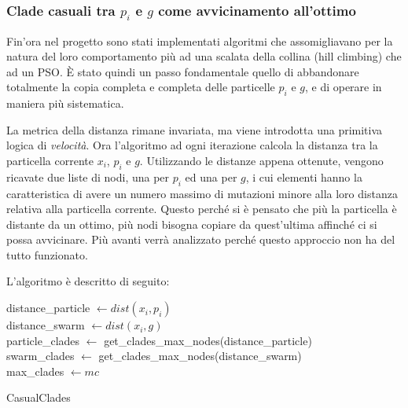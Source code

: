 \subsubsection{Clade casuali tra $p_i$ e $g$ come avvicinamento all'ottimo}
\label{chap:pso-adapt-calculate-5}
Fin'ora nel progetto sono stati implementati algoritmi che assomigliavano per la natura del loro comportamento più ad una scalata della collina (hill climbing) che ad un PSO. È stato quindi un passo fondamentale quello di abbandonare totalmente la copia completa e completa delle particelle $p_i$ e $g$, e di operare in maniera più sistematica.

La metrica della distanza rimane invariata, ma viene introdotta una primitiva logica di \textit{velocità}. Ora l'algoritmo ad ogni iterazione calcola la distanza tra la particella corrente $x_i$, $p_i$ e $g$. Utilizzando le distanze appena ottenute, vengono ricavate due liste di nodi, una per $p_i$ ed una per $g$, i cui elementi hanno la caratteristica di avere un numero massimo di mutazioni minore alla loro distanza relativa alla particella corrente. Questo perché si è pensato che più la particella è distante da un ottimo, più nodi bisogna copiare da quest'ultima affinché ci si possa avvicinare. Più avanti verrà analizzato perché questo approccio non ha del tutto funzionato.

L'algoritmo è descritto di seguito:

\begin{algorithm}[!h]
    distance\_particle $\gets dist(x_i, p_i)$ \\
    distance\_swarm $\gets dist(x_i, g)$ \\
    particle\_clades $\gets$ get\_clades\_max\_nodes(distance\_particle)\\
    swarm\_clades $\gets$ get\_clades\_max\_nodes(distance\_swarm) \\
    max\_clades $\gets mc$ \\
     
    \caption{CasualClades}
    \label{algo:pso-adapt-calculate-5-algo}
\end{algorithm}

